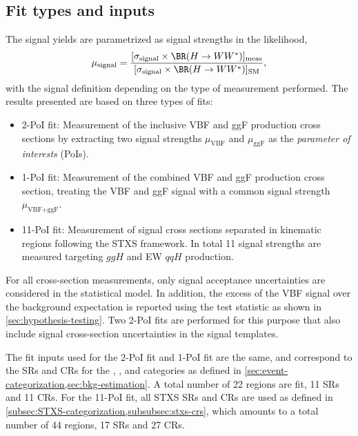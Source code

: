 \subsection{Fit types and inputs}
The signal yields are parametrized as signal strengths in the likelihood, 
\begin{equation}
    \label{eq:incl-ggF-VBF-signal-strengths}
    \mu_{\text{signal}} = \frac{ [ \sigma_{\text{signal}}  \times \BR(H \to WW^*) ]_\text{meas} } { [ \sigma_{\text{signal}} \times \BR(H \to WW^*) ]_\text{SM}}, 
\end{equation}
with the signal definition depending on the type of measurement performed.
The results presented are based on three types of fits:
\begin{itemize}
    \item 2-PoI fit: Measurement of the inclusive VBF and ggF production cross sections by extracting two signal strengths $\mu_{\text{VBF}}$ and $\mu_{\text{ggF}}$ as the \emph{parameter of interests} (PoIs).
    \item 1-PoI fit: Measurement of the combined VBF and ggF production cross section, treating the VBF and ggF signal with a common signal strength $\mu_{\text{VBF+ggF}}$.
    \item 11-PoI fit: Measurement of signal cross sections separated in kinematic regions following the STXS framework. In total 11 signal strengths are measured targeting $ggH$ and EW $qqH$ production.
\end{itemize}
For all cross-section measurements, only signal acceptance uncertainties are considered in the statistical model. 
In addition, the excess of the VBF signal over the background expectation is reported using the test statistic as shown in \cref{sec:hypothesis-testing}. Two 2-PoI fits are performed for this purpose that also include signal cross-section uncertainties in the signal templates. 

The fit inputs used for the 2-PoI fit and 1-PoI fit are the same, and correspond to the SRs and CRs for the \ZeroJet, \OneJet, and \TwoJet categories as defined in \cref{sec:event-categorization,sec:bkg-estimation}. A total number of 22 regions are fit, 11 SRs and 11 CRs.
For the 11-PoI fit, all STXS SRs and CRs are used as defined in \cref{subsec:STXS-categorization,subsubsec:stxs-crs}, which amounts to a total number of 44 regions, 17 SRs and 27 CRs. 

